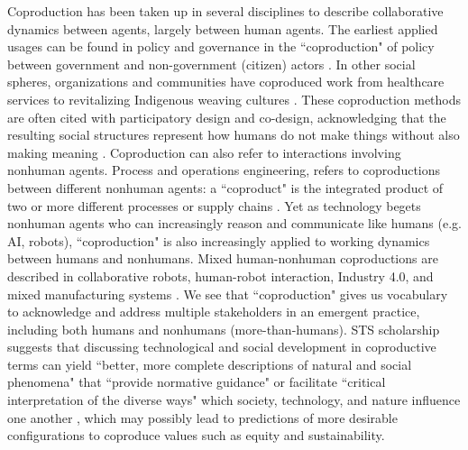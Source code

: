 Coproduction has been taken up in several disciplines to describe collaborative dynamics between agents, largely between human agents. The earliest applied usages can be found in policy and governance in the ``coproduction" of policy between government and non-government (citizen) actors \todo{[32,103]}. In other social spheres, organizations and communities have coproduced work from healthcare services \todo{[121]} to revitalizing Indigenous weaving cultures \todo{[10]}. These coproduction methods are often cited with participatory design and co-design, acknowledging that the resulting social structures represent how humans do not make things without also making meaning \todo{[66]}. Coproduction can also refer to interactions involving nonhuman agents. Process and operations engineering, refers to coproductions between different nonhuman agents: a ``coproduct" is the integrated product of two or more different processes or supply chains \todo{[3,83]}. Yet as technology begets nonhuman agents who can increasingly reason and communicate like humans (e.g. AI, robots), ``coproduction" is also increasingly applied to working dynamics between humans and nonhumans. Mixed human-nonhuman coproductions are described in collaborative robots, human-robot interaction, Industry 4.0, and mixed manufacturing systems \todo{[30,42]}. We see that ``coproduction" gives us vocabulary to acknowledge and address multiple stakeholders in an emergent practice, including both humans and nonhumans (more-than-humans). STS scholarship suggests that discussing technological and social development in coproductive terms can yield ``better, more complete descriptions of natural and social phenomena" that ``provide normative guidance" or facilitate ``critical interpretation of the diverse ways" which society, technology, and nature influence one another \todo{[66,67]}, which may possibly lead to predictions of more desirable configurations to coproduce values such as equity and sustainability.


